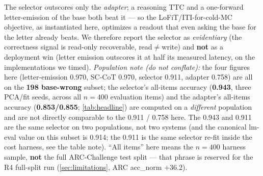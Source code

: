 The selector outscores only the \emph{adapter}; a reasoning TTC and a
one-forward letter-emission of the base both beat it --- so the
LoFiT/ITI-for-cold-MC objective, as instantiated here, optimizes a readout that even
asking the base for the letter already beats. We therefore report the selector as \emph{evidentiary} (the
correctness signal is read-only recoverable, read${\neq}$write) and \textbf{not} as
a deployment win (letter emission outscores it at half its measured latency, on the
implementations we timed).
\emph{Population note (do not conflate):} the four figures here (letter-emission
0.970, SC-CoT 0.970, selector 0.911, adapter 0.758) are all on the \textbf{198
base-wrong}
subset; the selector's all-items accuracy (\textbf{0.943}, three PCA/fit seeds, across all
$n{=}400$ evaluation items) and the adapter's all-items accuracy
(\textbf{0.853/0.855}; \cref{tab:headline}) are computed on a \emph{different}
population and are not directly comparable to the 0.911 / 0.758 here. The 0.943 and
0.911 are the same selector on two populations, not two systems (and the canonical
lm-eval value on this subset is 0.914; the 0.911 is the same selector re-fit inside the
cost harness, see the table note). ``All items'' here
means the $n{=}400$ harness sample, \textbf{not} the full ARC-Challenge test split
--- that phrase is reserved for the R4 full-split run (\cref{sec:limitations}, ARC
acc\_norm $+36.2$).

